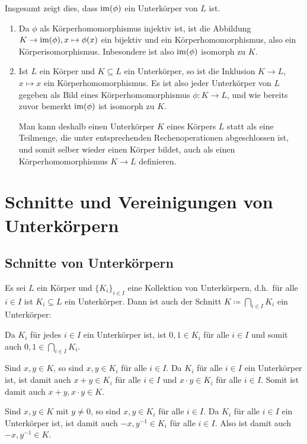Insgesamt zeigt dies, dass $\mathrm{im}(\phi)$ ein Unterkörper von $L$ ist.

\begin{bem}
 \begin{enumerate}[leftmargin=*]
  \item
   Da $\phi$ als Körperhomomorphismus injektiv ist, ist die Abbildung $K \to \mathrm{im}(\phi), x \mapsto \phi(x)$ ein bijektiv und ein Körperhomomorphismus, also ein Körperisomorphismus. Inbesondere ist also $\mathrm{im}(\phi)$ isomorph zu $K$.
  \item
   Ist $L$ ein Körper und $K \subseteq L$ ein Unterkörper, so ist die Inklusion $K \to L$, $x \mapsto x$ ein Körperhomomorphismus. Es ist also jeder Unterkörper von $L$ gegeben als Bild eines Körperhomomorphismus $\phi \colon K \to L$, und wie bereits zuvor bemerkt $\mathrm{im}(\phi)$ ist isomorph zu $K$.
   
   Man kann deshalb einen Unterkörper $K$ eines Körpers $L$ statt als eine Teilmenge, die unter entsprechenden Rechenoperationen abgeschlossen ist, und somit selber wieder einen Körper bildet, auch als einen Körperhomomorphismus $K \to L$ definieren.
 \end{enumerate}
\end{bem}





\section{Schnitte und Vereinigungen von Unterkörpern}


\subsection{Schnitte von Unterkörpern}
Es sei $L$ ein Körper und $\{K_i\}_{i \in I}$ eine Kollektion von Unterkörpern, d.h.\ für alle $i \in I$ ist $K_i \subseteq L$ ein Unterkörper. Dann ist auch der Schnitt $K \coloneqq \bigcap_{i \in I} K_i$ ein Unterkörper:

Da $K_i$ für jedes $i \in I$ ein Unterkörper ist, ist $0,1 \in K_i$ für alle $i \in I$ und somit auch $0,1 \in \bigcap_{i \in I} K_i$.

Sind $x,y \in K$, so sind $x,y \in K_i$ für alle $i \in I$. Da $K_i$ für alle $i \in I$ ein Unterkörper ist, ist damit auch $x+y \in K_i$ für alle $i \in I$ und $x \cdot y \in K_i$ für alle $i \in I$. Somit ist damit auch $x + y, x \cdot y \in K$.

Sind $x,y  \in K$ mit $y \neq 0$, so sind $x,y \in K_i$ für alle $i \in I$. Da $K_i$ für alle $i \in I$ ein Unterkörper ist, ist damit auch $-x, y^{-1} \in K_i$ für alle $i \in I$. Also ist damit auch $-x, y^{-1} \in K$.

